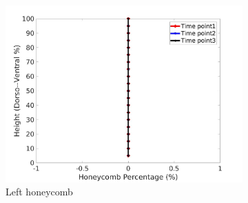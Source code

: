 \begin{figure}[H]
\begin{subfigure}{.42\linewidth}
  \includegraphics[width=\linewidth,trim={{.0\wd0} {.0\wd0} {.0\wd0} {.0\wd0}},clip]{Appendix/Image_AppexA/DorsoToVentral/IPF3LeftLungHoneycombDiseaseDorsoToVentral.jpg} %
  \caption{Left honeycomb}
  \label{fig:IPF3DiseaseDorsoToVentral-e} 
\end{subfigure} 
\begin{subfigure}{.42\linewidth}%

\end{subfigure}
\end{figure}
